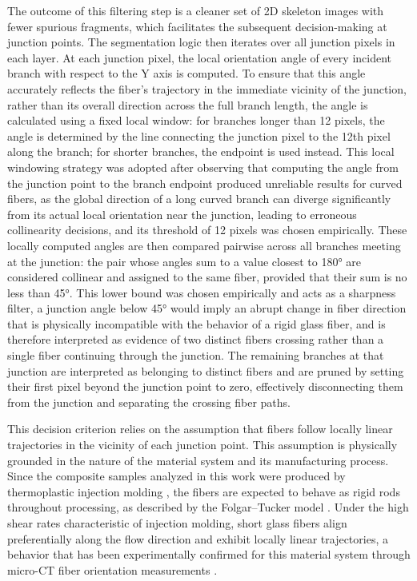 The outcome of this filtering step is a cleaner set of 2D skeleton images with fewer spurious fragments, which facilitates the subsequent decision-making at junction points. The segmentation logic then iterates over all junction pixels in each layer. At each junction pixel, the local orientation angle of every incident branch with respect to the Y axis is computed. To ensure that this angle accurately reflects the fiber's trajectory in the immediate vicinity of the junction, rather than its overall direction across the full branch length, the angle is calculated using a fixed local window: for branches longer than 12 pixels, the angle is determined by the line connecting the junction pixel to the 12th pixel along the branch; for shorter branches, the endpoint is used instead. This local windowing strategy was adopted after observing that computing the angle from the junction point to the branch endpoint produced unreliable results for curved fibers, as the global direction of a long curved branch can diverge significantly from its actual local orientation near the junction, leading to erroneous collinearity decisions, and its threshold of 12 pixels was chosen empirically. These locally computed angles are then compared pairwise across all branches meeting at the junction: the pair whose angles sum to a value closest to 180° are considered collinear and assigned to the same fiber, provided that their sum is no less than 45°. This lower bound was chosen empirically and acts as a sharpness filter, a junction angle below 45° would imply an abrupt change in fiber direction that is physically incompatible with the behavior of a rigid glass fiber, and is therefore interpreted as evidence of two distinct fibers crossing rather than a single fiber continuing through the junction. The remaining branches at that junction are interpreted as belonging to distinct fibers and are pruned by setting their first pixel beyond the junction point to zero, effectively disconnecting them from the junction and separating the crossing fiber paths.

This decision criterion relies on the assumption that fibers follow locally linear trajectories in the vicinity of each junction point. This assumption is physically grounded in the nature of the material system and its manufacturing process. Since the composite samples analyzed in this work were produced by thermoplastic injection molding \cite{aguiar-base}, the fibers are expected to behave as rigid rods throughout processing, as described by the Folgar--Tucker model \cite{folgar1984}. Under the high shear rates characteristic of injection molding, short glass fibers align preferentially along the flow direction and exhibit locally linear trajectories, a behavior that has been experimentally confirmed for this material system through micro-CT fiber orientation measurements \cite{aguiar-base}.

